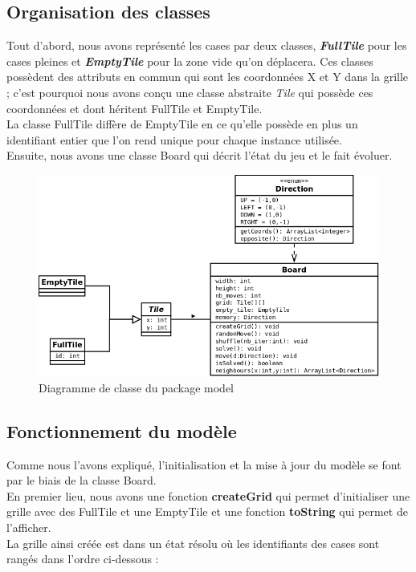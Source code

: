 \documentclass[a4paper,12pt]{article} %
\begin{document}
\subsection{Organisation des classes}

Tout d'abord, nous avons représenté les cases par deux classes, \textit{\textbf{FullTile}} pour les cases pleines et \textit{\textbf{EmptyTile}} pour la zone vide qu'on déplacera. Ces classes possèdent des attributs en commun qui sont les coordonnées X et Y dans la grille ; c'est pourquoi nous avons conçu une classe abstraite \textit{Tile} qui possède ces coordonnées et dont héritent FullTile et EmptyTile.\\
La classe FullTile diffère de EmptyTile en ce qu'elle possède en plus un identifiant entier que l'on rend unique pour chaque instance utilisée.\\

Ensuite, nous avons une classe Board qui décrit l'état du jeu et le fait évoluer.

\begin{figure}[!h]
\centering
\includegraphics[scale=0.4]{images/model.png}
\caption{Diagramme de classe du package model}
\end{figure}

\newpage

\subsection{Fonctionnement du modèle}

Comme nous l'avons expliqué, l'initialisation et la mise à jour du modèle se font par le biais de la classe Board.\\

En premier lieu, nous avons une fonction \textbf{createGrid} qui permet d'initialiser une grille avec des FullTile et une EmptyTile et une fonction \textbf{toString} qui permet de l'afficher.\\
La grille ainsi créée est dans un état résolu où les identifiants des cases sont rangés dans l'ordre ci-dessous :
\end{document}

